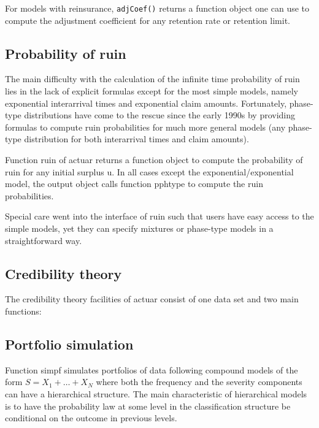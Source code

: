 \documentclass[12pt]{article}
\begin{document}
For models with reinsurance, \texttt{adjCoef()} returns a function object one can use to compute the adjustment coefficient for any retention rate or retention limit.

\subsection{Probability of ruin}

The main difficulty with the calculation of the infinite time probability of ruin lies in the lack of explicit formulas except for the most simple models, namely exponential interarrival times and exponential claim amounts. Fortunately, phase-type distributions have come to the rescue since the early 1990s by providing formulas to compute ruin probabilities for much more general models (any phase-type distribution for both interarrival times and claim amounts).

Function ruin of actuar returns a function object to compute the probability of ruin for any initial surplus u. In all cases except the exponential/exponential model, the output object calls function pphtype to compute the ruin probabilities.

Special care went into the interface of ruin such that users have easy access to the simple models, yet they can specify mixtures or phase-type models in a straightforward way.

\subsection{Credibility theory}

The credibility theory facilities of actuar consist of one data set and two main functions: 

\subsection{Portfolio simulation}

Function simpf simulates portfolios of data following compound models of the form $S = X_1 + \ldots + X_N$ where both the frequency and the severity components can have a hierarchical structure. The main characteristic of hierarchical models is to have the probability law at some level in the classification structure be conditional on the outcome in previous levels.
\end{document}
